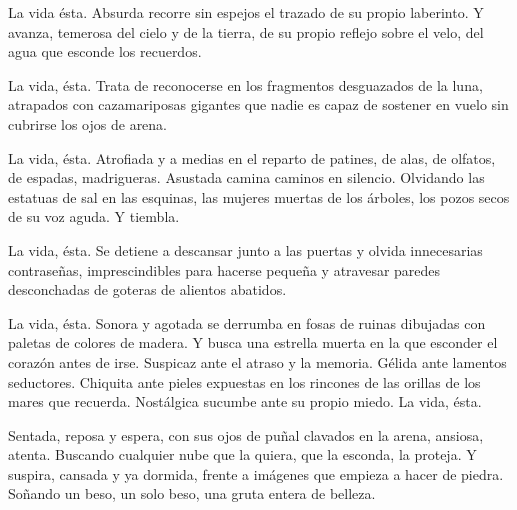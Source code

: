 La vida ésta. Absurda recorre sin espejos el trazado de su propio laberinto. Y avanza, temerosa del cielo y de la tierra, de su propio reflejo sobre el velo, del agua que esconde los recuerdos.

La vida, ésta. Trata de reconocerse en los fragmentos desguazados de la luna, atrapados con cazamariposas gigantes que nadie es capaz de sostener en vuelo sin cubrirse los ojos de arena.

La vida, ésta. Atrofiada y a medias en el reparto de patines, de alas, de olfatos, de espadas, madrigueras. Asustada camina caminos en silencio. Olvidando las estatuas de sal en las esquinas, las mujeres muertas de los árboles, los pozos secos de su voz aguda. Y tiembla.

La vida, ésta. Se detiene a descansar junto a las puertas y olvida innecesarias contraseñas, imprescindibles para hacerse pequeña y atravesar paredes desconchadas de goteras de alientos abatidos.

La vida, ésta. Sonora y agotada se derrumba en fosas de ruinas dibujadas con paletas de colores de madera. Y busca una estrella muerta en la que esconder el corazón antes de irse. Suspicaz ante el atraso y la memoria. Gélida ante lamentos seductores. Chiquita ante pieles expuestas en los rincones de las orillas de los mares que recuerda. Nostálgica sucumbe ante su propio miedo. La vida, ésta.

Sentada, reposa y espera, con sus ojos de puñal clavados en la arena, ansiosa, atenta. Buscando cualquier nube que la quiera, que la esconda, la proteja. Y suspira, cansada y ya dormida, frente a imágenes que empieza a hacer de piedra. Soñando un beso, un solo beso, una gruta entera de belleza.


